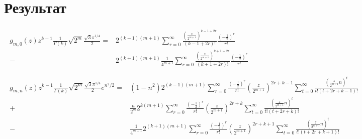 \documentclass[a4paper, fleqn]{report}
\begin{document}
\section{Результат}
\begin{align*}
\begin{split}
     g_{m,0}(z) z^{k-1} \frac{1}{\Gamma(k)} \sqrt{2^m} \frac{\sqrt{3} \pi^{1 /4}}{2}  =
        {}& 2^{(k-1)(m+1)} \sum_{r=0}^{\infty} \frac{\left(\frac{z}{2^{m+1}}\right)^{k-1+2r}}{(k-1+2r)!} \frac{\left( -\frac{1}{2} \right)^r }{r!} \\
       -{}& 2^{(k+1)(m+1)} \frac{1}{4^{m+1}} \sum_{r=0}^{\infty} \frac{\left(\frac{z}{2^{m+1}}\right)^{k+1+2r}}{(k+1+2r)!} \frac{\left( -\frac{1}{2} \right)^r }{r!} \\
\end{split} \\
\begin{split}
     g_{m,n}(z) z^{k-1} \frac{1}{\Gamma(k)} \sqrt{2^m} \frac{\sqrt{3} \pi^{1 /4}}{2} e^{n^2 /2} 
    ={}& (1-n^2) 2^{(k-1)(m+1)} \sum_{r=0}^{\infty} \frac{\left( -\frac{1}{2} \right)^r}{r!} \left(\frac{z}{2^{m+1}}\right)^{2r+k-1} \sum_{t=0}^{\infty} \frac{\left(\frac{z}{2^{m+1}}n\right)^{t}}{t!(t+2r+k-1)!} \\
    +{}& \frac{n}{2^m} 2^{k(m+1)} \sum_{r=0}^{\infty} \frac{\left( -\frac{1}{2} \right)^r}{r!} \left(\frac{z}{2^{m+1}}\right)^{2r+k} \sum_{t=0}^{\infty} \frac{\left(\frac{z}{2^{m+1}}n\right)^{t}}{t!(t+2r+k)!} \\
    -{}& \frac{1}{4^{m+1}} 2^{(k+1)(m+1)} \sum_{r=0}^{\infty} \frac{\left( -\frac{1}{2} \right)^r}{r!} \left(\frac{z}{2^{m+1}}\right)^{2r+k+1} \sum_{t=0}^{\infty} \frac{\left(\frac{z}{2^{m+1}}n\right)^{t}}{t!(t+2r+k+1)!} \\
\end{split}
\end{align*}
\end{document}
